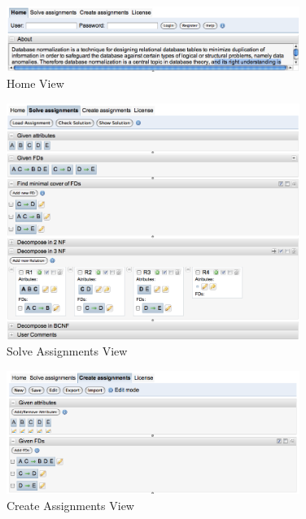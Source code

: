 \begin{figure}[h]
	\begin{center}
		\includegraphics[width=0.85\textwidth]{./img/screen-tab1.png}
		\caption{Home View}
		\label{fig:hv}
	\end{center}
\end{figure}

\begin{figure}[h]
	\begin{center}
		\includegraphics[width=0.85\textwidth]{./img/screen-tab2.png}
		\caption{Solve Assignments View}
		\label{fig:sav}
	\end{center}
\end{figure}

\begin{figure}[h]
	\begin{center}
		\includegraphics[width=0.85\textwidth]{./img/screen-tab3.png}
		\caption{Create Assignments View}
		\label{fig:cav}
	\end{center}
\end{figure}



